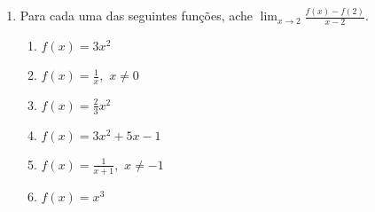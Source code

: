 \begin{enumerate}
\item Para cada uma das seguintes funções, ache $\displaystyle\lim_{x\longrightarrow2} \frac{f(x)-f(2)}{x-2}.$
\begin{multicols}{3}

\begin{enumerate}
\item $f(x)=3x^2$
\item $f(x)=\displaystyle\frac{1}{x},$ $x\ne0$
\item $f(x)=\displaystyle\frac{2}{3}x^2$
\item $f(x)=3x^2+5x-1$
\item $f(x)=\displaystyle\frac{1}{x+1},$ $x\ne-1$
\item $f(x)=x^3$
\end{enumerate}
\end{multicols}


\end{enumerate}
